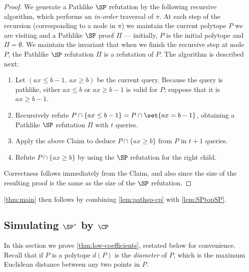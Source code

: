 \documentclass{toc}
\begin{document}
\begin{proof}
	We generate a Pathlike $\SP$ refutation by the following recursive algorithm, which performs an \emph{in-order} traversal of $\pi$. 
	At each step of the recursion (corresponding to a node in $\pi$) we maintain the current polytope $P$ we are visiting and a Pathlike $\SP$ proof $\Pi$ --- initially, $P$ is the initial polytope and $\Pi = \emptyset$. 
	We maintain the invariant that when we finish the recursive step at node $P$, the Pathlike $\SP$ refutation $\Pi$ is a refutation of $P$. 
	The algorithm is described next:
	\begin{enumerate}
		\item Let $(ax \leq b-1,~ ax \geq b)$ be the current query. Because the query is pathlike, either $ax \leq b$ or $ax \geq b-1$ is valid for $P$; suppose that it is $ax \geq b-1$. 
		\item Recursively refute $P \cap \{ ax \leq b-1\} = P \cap \set{ax = b-1}$, obtaining a Pathlike $\SP$ refutation $\Pi$ with $t$ queries. 
		\item Apply the above Claim to deduce $P \cap \{ax \geq b\}$ from $P$ in $t+1$ queries. 
		\item Refute $P \cap \{ ax \geq b\}$ by using the $\SP$ refutation for the right child. 
	\end{enumerate}
	Correctness follows immediately from the Claim, and also since the size of the resulting proof is the same as the size of the $\SP$ refutation. 		
	\end{proof}
	
	\autoref{thm:main} then follows by combining \autoref{lem:pathsp-cp} with \autoref{lem:SPtopSP}.


\subsection{Simulating \texorpdfstring{$\SP^*$}{SP*} by
          \texorpdfstring{$\CP$}{CP}}
\label{sec:quasipoly-simulation}
In this section we prove \autoref{thm:low-coefficients}, restated below for convenience.
Recall that if $P$ is a polytope $d(P)$ is the \emph{diameter} of $P$, which is the maximum Euclidean distance between any two points in $P$.

\lowcoefficients*
\end{document}
